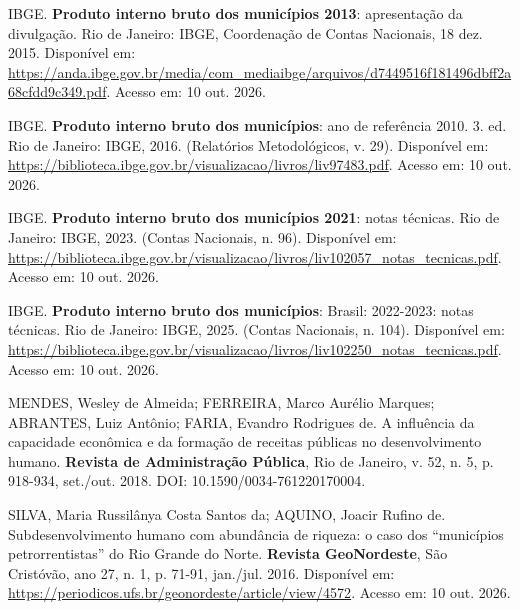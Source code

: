 \documentclass[12pt,a4paper]{article}
\newenvironment{referencias}{\begin{singlespace}\setlength{\parindent}{0pt}\setlength{\parskip}{6pt}\raggedright\footnotesize}{\end{singlespace}}
\begin{document}
\begin{referencias}
IBGE. \textbf{Produto interno bruto dos municípios 2013}: apresentação da divulgação. Rio de Janeiro: IBGE, Coordenação de Contas Nacionais, 18 dez. 2015. Disponível em: \url{https://anda.ibge.gov.br/media/com_mediaibge/arquivos/d7449516f181496dbff2a68cfdd9c349.pdf}. Acesso em: 10 out. 2026.

IBGE. \textbf{Produto interno bruto dos municípios}: ano de referência 2010. 3. ed. Rio de Janeiro: IBGE, 2016. (Relatórios Metodológicos, v. 29). Disponível em: \url{https://biblioteca.ibge.gov.br/visualizacao/livros/liv97483.pdf}. Acesso em: 10 out. 2026.

IBGE. \textbf{Produto interno bruto dos municípios 2021}: notas técnicas. Rio de Janeiro: IBGE, 2023. (Contas Nacionais, n. 96). Disponível em: \url{https://biblioteca.ibge.gov.br/visualizacao/livros/liv102057_notas_tecnicas.pdf}. Acesso em: 10 out. 2026.

IBGE. \textbf{Produto interno bruto dos municípios}: Brasil: 2022-2023: notas técnicas. Rio de Janeiro: IBGE, 2025. (Contas Nacionais, n. 104). Disponível em: \url{https://biblioteca.ibge.gov.br/visualizacao/livros/liv102250_notas_tecnicas.pdf}. Acesso em: 10 out. 2026.

MENDES, Wesley de Almeida; FERREIRA, Marco Aurélio Marques; ABRANTES, Luiz Antônio; FARIA, Evandro Rodrigues de. A influência da capacidade econômica e da formação de receitas públicas no desenvolvimento humano. \textbf{Revista de Administração Pública}, Rio de Janeiro, v. 52, n. 5, p. 918-934, set./out. 2018. DOI: 10.1590/0034-761220170004.


SILVA, Maria Russilânya Costa Santos da; AQUINO, Joacir Rufino de. Subdesenvolvimento humano com abundância de riqueza: o caso dos ``municípios petrorrentistas'' do Rio Grande do Norte. \textbf{Revista GeoNordeste}, São Cristóvão, ano 27, n. 1, p. 71-91, jan./jul. 2016. Disponível em: \url{https://periodicos.ufs.br/geonordeste/article/view/4572}. Acesso em: 10 out. 2026.

\end{referencias}
\end{document}
